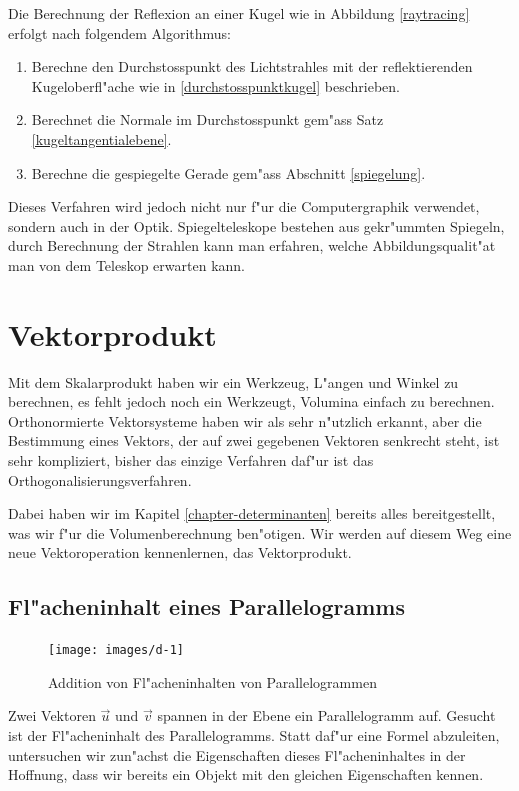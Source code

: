 Die Berechnung der Reflexion an einer Kugel wie in Abbildung \ref{raytracing}
erfolgt nach folgendem Algorithmus:
\begin{enumerate}
\item Berechne den Durchstosspunkt des Lichtstrahles mit der reflektierenden
Kugeloberfl"ache wie in \ref{durchstosspunktkugel} beschrieben.  
\item Berechnet die Normale im Durchstosspunkt gem"ass Satz \ref{kugeltangentialebene}.
\item Berechne die gespiegelte Gerade gem"ass Abschnitt \ref{spiegelung}.
\end{enumerate}
Dieses Verfahren wird jedoch nicht nur f"ur die Computergraphik verwendet,
sondern auch in der Optik. Spiegelteleskope bestehen aus gekr"ummten Spiegeln,
durch Berechnung der Strahlen kann man erfahren, welche Abbildungsqualit"at
man von dem Teleskop erwarten kann.

\section{Vektorprodukt}
Mit dem Skalarprodukt haben wir ein Werkzeug, L"angen und Winkel zu berechnen,
es fehlt jedoch noch ein Werkzeugt, Volumina einfach zu berechnen. Orthonormierte
Vektorsysteme haben wir als sehr n"utzlich erkannt, aber die Bestimmung eines
Vektors, der auf zwei gegebenen Vektoren senkrecht steht, ist sehr kompliziert,
bisher das einzige Verfahren daf"ur ist das Orthogonalisierungsverfahren.

Dabei haben wir im Kapitel \ref{chapter-determinanten} bereits alles
bereitgestellt,
was wir f"ur die Volumenberechnung ben"otigen. Wir werden auf diesem
Weg eine neue Vektoroperation kennenlernen, das Vektorprodukt.

\subsection{Fl"acheninhalt eines Parallelogramms}
\begin{figure}
\begin{center}
\texttt{[image: images/d-1]}
\end{center}
\caption{Addition von Fl"acheninhalten von Parallelogrammen 
\label{image-flaeche-addition}}
\end{figure}
Zwei Vektoren $\vec u$ und $\vec v$ spannen in der Ebene ein Parallelogramm
auf. Gesucht ist der Fl"acheninhalt des Parallelogramms. Statt daf"ur eine
Formel abzuleiten, untersuchen wir zun"achst die Eigenschaften dieses
Fl"acheninhaltes in der Hoffnung, dass wir bereits ein Objekt mit den
gleichen Eigenschaften kennen.

